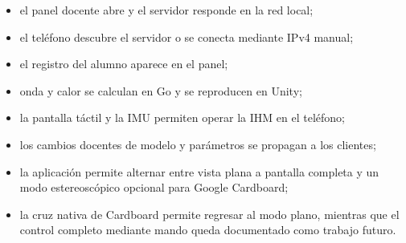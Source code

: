 \begin{itemize}
    \item el panel docente abre y el servidor responde en la red local;
    \item el teléfono descubre el servidor o se conecta mediante IPv4 manual;
    \item el registro del alumno aparece en el panel;
    \item onda y calor se calculan en Go y se reproducen en Unity;
    \item la pantalla táctil y la IMU permiten operar la IHM en el teléfono;
    \item los cambios docentes de modelo y parámetros se propagan a los clientes;
    \item la aplicación permite alternar entre vista plana a pantalla completa y un
    modo estereoscópico opcional para Google Cardboard;
    \item la cruz nativa de Cardboard permite regresar al modo plano, mientras que el
    control completo mediante mando queda documentado como trabajo futuro.
\end{itemize}
